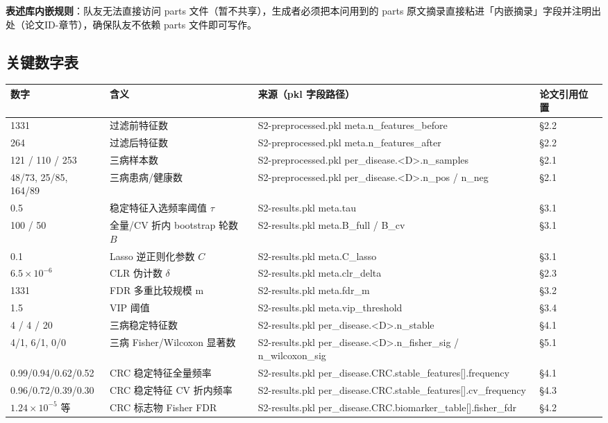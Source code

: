 \documentclass{article}   %
\begin{document}
\textbf{表述库内嵌规则}：队友无法直接访问 parts 文件（暂不共享），生成者必须把本问用到的 parts
原文摘录直接粘进「内嵌摘录」字段并注明出处（论文ID-章节），确保队友不依赖 parts 文件即可写作。

\subsection{关键数字表}

\begin{center}
\footnotesize
\begin{tabular}{llll}
\toprule
数字 & 含义 & 来源（pkl 字段路径） & 论文引用位置 \\
\midrule
1331 & 过滤前特征数 & S2-preprocessed.pkl meta.n\_features\_before & §2.2 \\
264 & 过滤后特征数 & S2-preprocessed.pkl meta.n\_features\_after & §2.2 \\
121 / 110 / 253 & 三病样本数 & S2-preprocessed.pkl per\_disease.<D>.n\_samples & §2.1 \\
48/73, 25/85, 164/89 & 三病患病/健康数 & S2-preprocessed.pkl per\_disease.<D>.n\_pos / n\_neg & §2.1 \\
0.5 & 稳定特征入选频率阈值 $\tau$ & S2-results.pkl meta.tau & §3.1 \\
100 / 50 & 全量/CV 折内 bootstrap 轮数 $B$ & S2-results.pkl meta.B\_full / B\_cv & §3.1 \\
0.1 & Lasso 逆正则化参数 $C$ & S2-results.pkl meta.C\_lasso & §3.1 \\
$6.5\times10^{-6}$ & CLR 伪计数 $\delta$ & S2-results.pkl meta.clr\_delta & §2.3 \\
1331 & FDR 多重比较规模 m & S2-results.pkl meta.fdr\_m & §3.2 \\
1.5 & VIP 阈值 & S2-results.pkl meta.vip\_threshold & §3.4 \\
4 / 4 / 20 & 三病稳定特征数 & S2-results.pkl per\_disease.<D>.n\_stable & §4.1 \\
4/1, 6/1, 0/0 & 三病 Fisher/Wilcoxon 显著数 & S2-results.pkl per\_disease.<D>.n\_fisher\_sig / n\_wilcoxon\_sig & §5.1 \\
0.99/0.94/0.62/0.52 & CRC 稳定特征全量频率 & S2-results.pkl per\_disease.CRC.stable\_features[].frequency & §4.1 \\
0.96/0.72/0.39/0.30 & CRC 稳定特征 CV 折内频率 & S2-results.pkl per\_disease.CRC.stable\_features[].cv\_frequency & §4.3 \\
$1.24\times10^{-5}$ 等 & CRC 标志物 Fisher FDR & S2-results.pkl per\_disease.CRC.biomarker\_table[].fisher\_fdr & §4.2 \\

\end{tabular}
\end{center}
\end{document}
